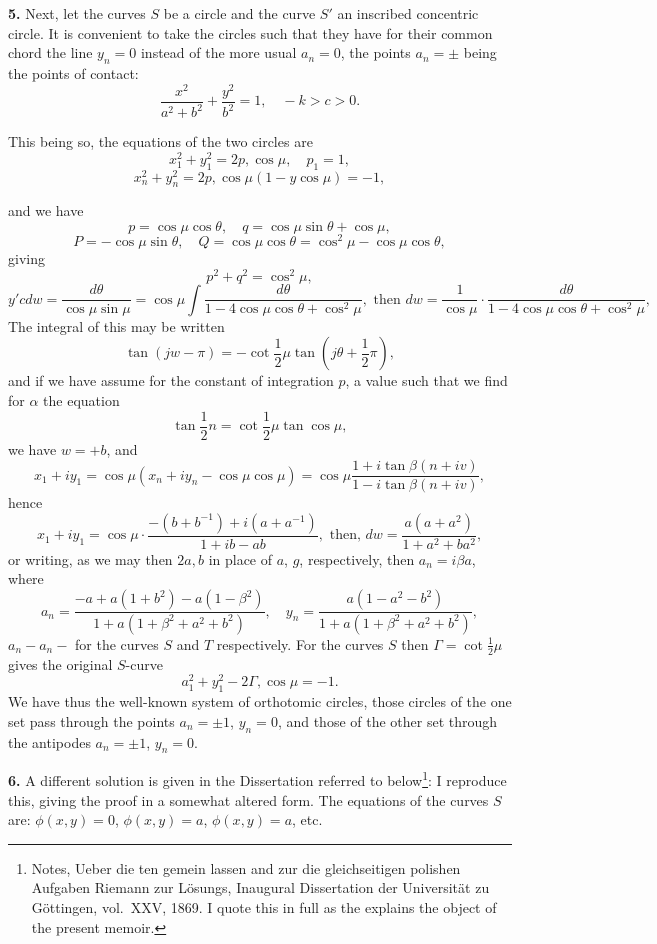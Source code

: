 \documentclass[11pt,a4paper]{book}
\begin{document}
\textbf{5.} Next, let the curves $S$ be a circle and the curve $S'$ an inscribed concentric circle. It is convenient to take the circles such that they have for their common chord the line $y_n = 0$ instead of the more usual $a_n = 0$, the points $a_n = \pm$ being the points of contact:
\[
\frac{x^2}{a^2 + b^2} + \frac{y^2}{b^2} = 1, \quad - k > c > 0.
\]

This being so, the equations of the two circles are
\[
x_1^2 + y_1^2 = 2p, \cos \mu, \quad p_1 = 1,
\]
\[
x_n^2 + y_n^2 = 2p, \cos \mu (1 - y \cos \mu) = - 1,
\]

and we have
\[
p = \cos \mu \cos \theta, \quad q = \cos \mu \sin \theta + \cos \mu,
\]
\[
P = -\cos \mu \sin \theta, \quad Q = \cos \mu \cos \theta = \cos^2 \mu - \cos \mu \cos \theta,
\]
giving
\[
p^2 + q^2 = \cos^2 \mu,
\]
\[
y' c d w = \frac{d\theta}{\cos \mu \sin \mu} = \cos \mu \int \frac{d\theta}{1 - 4 \cos \mu \cos \theta + \cos^2 \mu}, \text{ then } dw = \frac{1}{\cos \mu} \cdot \frac{d \theta}{1 - 4 \cos \mu \cos \theta + \cos^2 \mu},
\]
The integral of this may be written
\[
\tan (jw - \pi) = - \cot \frac{1}{2}\mu \tan (j\theta + \frac{1}{2}\pi),
\]
and if we have assume for the constant of integration $p$, a value such that
we find for $\alpha$ the equation
\[
\tan \frac{1}{2}n = \cot \frac{1}{2}\mu \tan \cos \mu,
\]
we have $w = + b$, and
\[
x_1 + i y_1 = \cos \mu (x_n + i y_n - \cos \mu \cos \mu) = \cos \mu \frac{1 + i \tan \beta(n + i v)}{1 - i \tan \beta(n + i v)},
\]
hence
\[
x_1 + i y_1 = \cos \mu \cdot \frac{- (b + b^{-1}) + i (a + a^{-1})}{1 + i b - a b}, \text{ then, } dw = \frac{a (a + a^2)}{1 + a^2 + b a^2},
\]
or writing, as we may then $2 a, b$ in place of $a$, $g$, respectively, then $a_n = i \beta a$, where
\[
a_n = \frac{- a + a (1 + b^2) - a(1 - \beta^2)}{1 + a (1 + \beta^2 + a^2 + b^2)}, \quad y_n = \frac{a (1 - a^2 - b^2)}{1 + a (1 + \beta^2 + a^2 + b^2)},
\]
$a_n - a_n -$ for the curves $S$ and $T$ respectively. For the curves $S$ then $\Gamma = \cot \frac{1}{2}\mu$ gives the original $S$-curve
\[
a_1^2 + y_1^2 - 2\Gamma, \cos \mu = - 1.
\]
We have thus the well-known system of orthotomic circles, those circles of the one set pass through the points $a_n = \pm 1$, $y_n = 0$, and those of the other set through the antipodes $a_n = \pm 1$, $y_n = 0$.

\textbf{6.} A different solution is given in the Dissertation referred to below\footnote{Notes, Ueber die ten gemein lassen and zur die gleichseitigen polishen Aufgaben Riemann zur Lösungs, Inaugural Dissertation der Universität zu Göttingen, vol.~XXV, 1869. I quote this in full as the explains the object of the present memoir.}: I reproduce this, giving the proof in a somewhat altered form. The equations of the curves $S$ are: $\phi(x, y) = 0$, $\phi(x, y) = a$, $\phi(x, y) = a$, etc.
\end{document}
